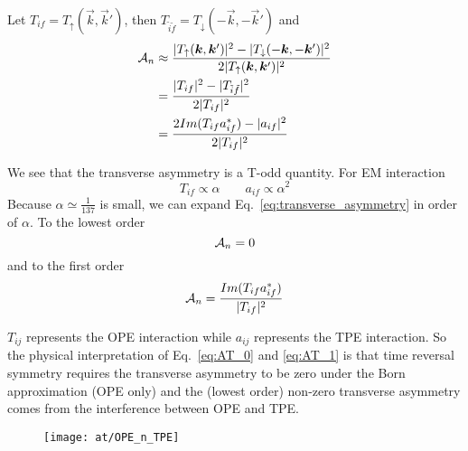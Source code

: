 Let $T_{if} = T_{\uparrow}(\vec{k}, \vec{k}')$, then $T_{\tilde{i}\tilde{f}} = T_\downarrow (-\vec{k}, -\vec{k}')$
and
\begin{equation}
    \begin{aligned}
	\mathcal{A}_n &\approx \frac{|T_{\uparrow}(\boldsymbol{k}, \boldsymbol{k}')|^2 - |T_{\downarrow}(-\boldsymbol{k}, -\boldsymbol{k}')|^2}{2|T_{\uparrow}(\boldsymbol{k}, \boldsymbol{k}')|^2} \\
	    &= \frac{|T_{if}|^2 - |T_{\tilde{i}\tilde{f}}|^2}{2|T_{if}|^2}  \\
	    &= \frac{2Im(T_{if}a^*_{if}) - |a_{if}|^2}{2|T_{if}|^2}
    \end{aligned}
    \label{eq:transverse_asymmetry}
\end{equation}

We see that the transverse asymmetry is a T-odd quantity. For EM interaction
\begin{equation}
    T_{if} \propto \alpha \qquad a_{if} \propto \alpha^2
\end{equation}
Because $\alpha \simeq \frac{1}{137}$ is small, we can expand Eq.~\ref{eq:transverse_asymmetry} 
in order of $\alpha$. To the lowest order
\begin{equation}
    \mathcal{A}_n = 0
    \label{eq:AT_0}
\end{equation}
and to the first order 
\begin{equation}
    \mathcal{A}_n = \frac{Im(T_{if}a^*_{if})}{|T_{if}|^2}
    \label{eq:AT_1}
\end{equation}

$T_{ij}$ represents the OPE interaction while $a_{ij}$ represents
the TPE interaction. So the physical interpretation of
Eq.~\ref{eq:AT_0} and \ref{eq:AT_1} is that time reversal symmetry requires 
the transverse asymmetry to be zero under the Born approximation (OPE only)
and the (lowest order) non-zero transverse asymmetry comes from the interference 
between OPE and TPE.
\begin{figure}[h!]
    \centering
    \texttt{[image: at/OPE\_n\_TPE]}
\end{figure}

